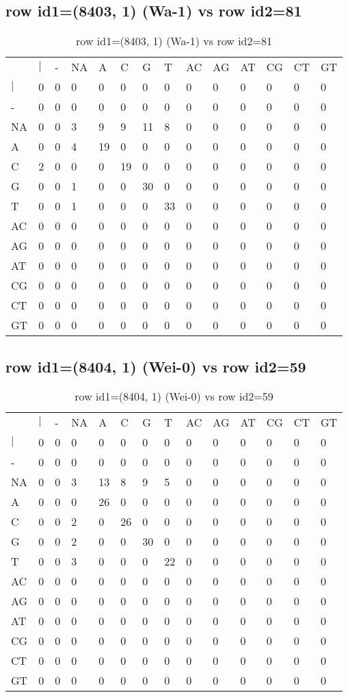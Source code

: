 \subsection{row id1=(8403, 1) (Wa-1) vs row id2=81}
\begin{center}
\begin{longtable}{|l|l|l|l|l|l|l|l|l|l|l|l|l|l|}
\caption{row id1=(8403, 1) (Wa-1) vs row id2=81} \label{table_dm668}\\
\hline
\\
\hline
&$|$&-&NA&A&C&G&T&AC&AG&AT&CG&CT&GT\\
$|$&0&0&0&0&0&0&0&0&0&0&0&0&0\\
-&0&0&0&0&0&0&0&0&0&0&0&0&0\\
NA&0&0&3&9&9&11&8&0&0&0&0&0&0\\
A&0&0&4&19&0&0&0&0&0&0&0&0&0\\
C&2&0&0&0&19&0&0&0&0&0&0&0&0\\
G&0&0&1&0&0&30&0&0&0&0&0&0&0\\
T&0&0&1&0&0&0&33&0&0&0&0&0&0\\
AC&0&0&0&0&0&0&0&0&0&0&0&0&0\\
AG&0&0&0&0&0&0&0&0&0&0&0&0&0\\
AT&0&0&0&0&0&0&0&0&0&0&0&0&0\\
CG&0&0&0&0&0&0&0&0&0&0&0&0&0\\
CT&0&0&0&0&0&0&0&0&0&0&0&0&0\\
GT&0&0&0&0&0&0&0&0&0&0&0&0&0\\
\hline
\end{longtable}
\end{center}

\subsection{row id1=(8404, 1) (Wei-0) vs row id2=59}
\begin{center}
\begin{longtable}{|l|l|l|l|l|l|l|l|l|l|l|l|l|l|}
\caption{row id1=(8404, 1) (Wei-0) vs row id2=59} \label{table_dm670}\\
\hline
\\
\hline
&$|$&-&NA&A&C&G&T&AC&AG&AT&CG&CT&GT\\
$|$&0&0&0&0&0&0&0&0&0&0&0&0&0\\
-&0&0&0&0&0&0&0&0&0&0&0&0&0\\
NA&0&0&3&13&8&9&5&0&0&0&0&0&0\\
A&0&0&0&26&0&0&0&0&0&0&0&0&0\\
C&0&0&2&0&26&0&0&0&0&0&0&0&0\\
G&0&0&2&0&0&30&0&0&0&0&0&0&0\\
T&0&0&3&0&0&0&22&0&0&0&0&0&0\\
AC&0&0&0&0&0&0&0&0&0&0&0&0&0\\
AG&0&0&0&0&0&0&0&0&0&0&0&0&0\\
AT&0&0&0&0&0&0&0&0&0&0&0&0&0\\
CG&0&0&0&0&0&0&0&0&0&0&0&0&0\\
CT&0&0&0&0&0&0&0&0&0&0&0&0&0\\
GT&0&0&0&0&0&0&0&0&0&0&0&0&0\\
\hline
\end{longtable}
\end{center}

